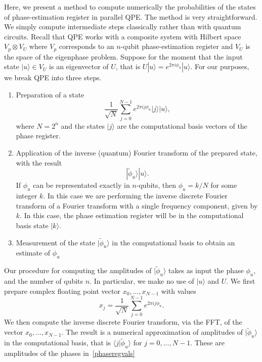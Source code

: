 \documentclass[superscriptaddress,nofootinbib,longbibliography,aps,pre]{revtex4-1}
\newcommand{\ket}[1]{|{#1}\rangle}
\newcommand{\braket}[2]{\langle{#1}|{#2}\rangle}
\begin{document}
Here, we present a method to compute numerically the probabilities
of the states of phase-estimation register in parallel QPE.
The method is very straightforward.
We simply compute intermediate steps classically rather than with quantum circuits.
Recall that QPE works with a composite system with Hilbert space $V_{p}\otimes V_{U}$
where $V_{p}$ corresponds to an $n$-qubit phase-estimation register and $V_{U}$ is
the space of the eigenphase problem.
Suppose for the moment that the input state $\ket{u}\in V_{U}$ is an eigenvector of
$U$, that is $U\ket{u}=e^{2\pi i \phi_{u}}\ket{u}$.
For our purposes, we break QPE into three steps.
%
\begin{enumerate}
\item{Preparation of a state
    \begin{equation}
      \label{aftercontrolledU}
      \frac{1}{\sqrt{N}} \sum_{j=0}^{N-1} e^{2\pi i j \phi_{u}} \ket{j}\ket{u},
    \end{equation}
    where $N=2^{n}$ and the states $\ket{j}$ are the computational basis vectors of the phase register.
  }
\item{Application of the inverse (quantum) Fourier transform of the prepared state, with the result
    \begin{equation}
      \ket{\tilde{\phi}_{u}} \ket{u}.
    \end{equation}
    If $\phi_{u}$ can be representated exactly in $n$-qubits, then $\phi_{u}=k/N$ for some integer $k$.
    In this case we are performing the inverse discrete Fourier transform of a Fourier transform with a single frequency
    component, given by $k$. In this case, the phase estimation register will be in the computational basis state $\ket{k}$.
    }
\item{Measurement of the state $\ket{\tilde{\phi}_{u}}$ in the computational basis to obtain an estimate of $\phi_{u}$}
\end{enumerate}
%
Our procedure for computing the amplitudes of $\ket{\tilde{\phi}_{u}}$
takes as input the phase $\phi_{u}$, and the number of qubits $n$.
In particular, we make no use of $\ket{u}$ and $U$.
We first prepare complex floating point vector $x_{0},\ldots, x_{N-1}$ with values
%
\begin{equation}
  x_{j} = \frac{1}{\sqrt{N}} \sum_{j=0}^{N-1} e^{2\pi i j \phi_{u}}.
\end{equation}
%
We then compute the inverse discrete Fourier transform,
 via the FFT, of the vector $x_{0},\ldots, x_{N-1}$.
The result is a numerical approximation of amplitudes of $\ket{\tilde{\phi}_{u}}$
in the computational basis, that is $\braket{j}{\tilde\phi_{u}}$ for $j=0,\ldots, N-1$.
These are amplitudes of the phases in~\eqref{phaseregvals}
\end{document}
